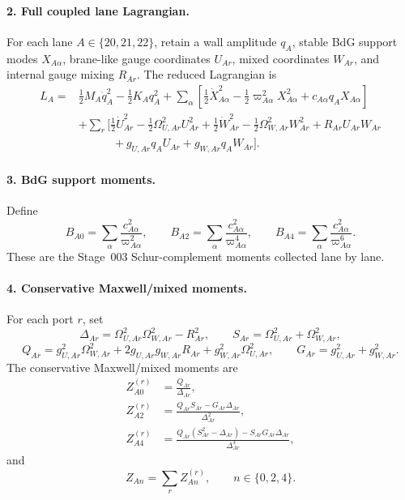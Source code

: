\paragraph{2. Full coupled lane Lagrangian.}
For each lane \(A\in\{20,21,22\}\), retain a wall amplitude \(q_A\), stable BdG support modes \(X_{A\alpha}\), brane-like gauge coordinates \(U_{A r}\), mixed coordinates \(W_{A r}\), and internal gauge mixing \(R_{A r}\).  The reduced Lagrangian is
\begin{align}
\label{eq:app-stage023-full-lagrangian}
L_A={}&\frac12M_A\dot q_A^2-\frac12K_Aq_A^2
+\sum_\alpha\left[\frac12\dot X_{A\alpha}^2-\frac12\varpi_{A\alpha}^2X_{A\alpha}^2+c_{A\alpha}q_AX_{A\alpha}\right]\\
&+\sum_r\bigl[\frac12\dot U_{A r}^2-\frac12\Omega_{U,A r}^2U_{A r}^2
+\frac12\dot W_{A r}^2-\frac12\Omega_{W,A r}^2W_{A r}^2
+R_{A r}U_{A r}W_{A r}\\
&\qquad\quad
+g_{U,A r}q_AU_{A r}+g_{W,A r}q_AW_{A r}\bigr].
\end{align}

\paragraph{3. BdG support moments.}
Define
\begin{equation}
\label{eq:app-stage023-b-moments}
\boxed{
B_{A0}=\sum_\alpha\frac{c_{A\alpha}^2}{\varpi_{A\alpha}^2},
\qquad
B_{A2}=\sum_\alpha\frac{c_{A\alpha}^2}{\varpi_{A\alpha}^4},
\qquad
B_{A4}=\sum_\alpha\frac{c_{A\alpha}^2}{\varpi_{A\alpha}^6}}.
\end{equation}
These are the Stage~003 Schur-complement moments collected lane by lane.

\paragraph{4. Conservative Maxwell/mixed moments.}
For each port \(r\), set
\begin{equation}
\label{eq:app-stage023-delta-s-q-g}
\Delta_{A r}=\Omega_{U,A r}^2\Omega_{W,A r}^2-R_{A r}^2,
\qquad
S_{A r}=\Omega_{U,A r}^2+\Omega_{W,A r}^2,
\end{equation}
\begin{equation}
Q_{A r}=g_{U,A r}^2\Omega_{W,A r}^2
+2g_{U,A r}g_{W,A r}R_{A r}
+g_{W,A r}^2\Omega_{U,A r}^2,
\qquad
G_{A r}=g_{U,A r}^2+g_{W,A r}^2.
\end{equation}
The conservative Maxwell/mixed moments are
\begin{align}
\label{eq:app-stage023-z-moments-port}
Z_{A0}^{(r)}&=\frac{Q_{A r}}{\Delta_{A r}},\\
Z_{A2}^{(r)}&=\frac{Q_{A r}S_{A r}-G_{A r}\Delta_{A r}}{\Delta_{A r}^2},\\
Z_{A4}^{(r)}&=\frac{Q_{A r}(S_{A r}^2-\Delta_{A r})-S_{A r}G_{A r}\Delta_{A r}}{\Delta_{A r}^3},
\end{align}
and
\begin{equation}
\label{eq:app-stage023-z-sum}
Z_{An}=\sum_rZ_{An}^{(r)},
\qquad
n\in\{0,2,4\}.
\end{equation}


